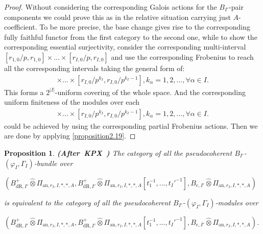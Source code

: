 \documentclass[12pt]{amsart}
\newtheorem{proposition}[theorem]{Proposition}
\theoremstyle{definition}
\numberwithin{equation}{section}
\begin{document}
\begin{proof}
Without considering the corresponding Galois actions for the $B_{I'}$-pair components we could prove this as in the relative situation carrying just $A$-coefficient. To be more precise, the base change gives rise to the corresponding fully faithful functor from the first category to the second one, while to show the corresponding essential surjectivity, consider the corresponding multi-interval $[r_{1,0}/p,r_{1,0}]\times...\times [r_{I,0}/p,r_{I,0}]$ and use the corresponding Frobenius to reach all the corresponding intervals taking the general form of:
\begin{align}
[r_{1,0}/p^{k_1},r_{1,0}/p^{k_1-1}]\times...\times [r_{I,0}/p^{k_I},r_{I,0}/p^{k_I-1}],k_\alpha=1,2,...,\forall\alpha\in I.	
\end{align}
This forms a $2^{|I|}$-uniform covering of the whole space. And the corresponding uniform finiteness of the modules over each 
\begin{align}
[r_{1,0}/p^{k_1},r_{1,0}/p^{k_1-1}]\times...\times [r_{I,0}/p^{k_I},r_{I,0}/p^{k_I-1}],k_\alpha=1,2,...,\forall\alpha\in I.	
\end{align}	
could be achieved by using the corresponding partial Frobenius actions. Then we are done by applying \cref{proposition2.19}. 	
\end{proof}


\begin{proposition} \mbox{\bf{(After KPX \cite[Proposition 2.2.7]{KPX})}}
The category of all the pseudocoherent $B_{I'}$-$(\varphi_I,\Gamma_I)$-bundle over 
\begin{center}
$(B^+_{\mathrm{dR},I'}	\widehat{\otimes}\Pi_{\mathrm{an},r_{I},I,*,*,A},B^+_{\mathrm{dR},I'}	\widehat{\otimes}\Pi_{\mathrm{an},r_{I},I,*,*,A}[t_1^{-1},...,t_I'^{-1}],B_{e,I'}	\widehat{\otimes}\Pi_{\mathrm{an},r_{I},I,*,*,A})$	
\end{center}
is equivalent to the category of all the pseudocoherent $B_{I'}$-$(\varphi_I,\Gamma_I)$-modules over 
\begin{center}
$(B^+_{\mathrm{dR},I'}	\widehat{\otimes}\Pi_{\mathrm{an},r_{I},I,*,*,A},B^+_{\mathrm{dR},I'}	\widehat{\otimes}\Pi_{\mathrm{an},r_{I},I,*,*,A}[t_1^{-1},...,t_I'^{-1}],B_{e,I'}	\widehat{\otimes}\Pi_{\mathrm{an},r_{I},I,*,*,A})$.	
\end{center}
\end{proposition}
\end{document}
